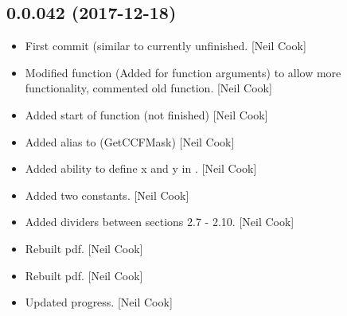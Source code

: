 \documentclass[a4paper,10pt,english]{report}
\begin{document}
\subsection{0.0.042 (2017-12-18)}
\label{\detokenize{misc/changelog:id509}}\begin{itemize}
\item {} 
First commit (similar to  \textendash{} currently unfinished.
{[}Neil Cook{]}

\item {} 
Modified  function (Added for function
arguments) to allow more functionality, commented old function. {[}Neil
Cook{]}

\item {} 
Added start of  function (not finished) {[}Neil Cook{]}

\item {} 
Added alias to  (GetCCFMask) {[}Neil Cook{]}

\item {} 
Added ability to define x and y in . {[}Neil
Cook{]}

\item {} 
Added two  constants. {[}Neil Cook{]}

\item {} 
Added dividers between sections 2.7 - 2.10. {[}Neil Cook{]}

\item {} 
Rebuilt pdf. {[}Neil Cook{]}

\item {} 
Rebuilt pdf. {[}Neil Cook{]}

\item {} 
Updated progress. {[}Neil Cook{]}

\end{itemize}
\end{document}
